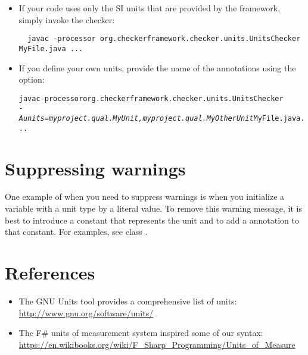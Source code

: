 \begin{itemize}
\item
If your code uses only the SI units that are provided by the
framework, simply invoke the checker:

\begin{Verbatim}
  javac -processor org.checkerframework.checker.units.UnitsChecker MyFile.java ...
\end{Verbatim}

\item
If you define your own units, provide the name of the annotations using the
 option:

\begin{alltt}
  javac -processor org.checkerframework.checker.units.UnitsChecker \ttbs
        \textit{-Aunits=myproject.qual.MyUnit,myproject.qual.MyOtherUnit} MyFile.java ...
\end{alltt}
\end{itemize}



\section{Suppressing warnings\label{units-suppressing}}

One example of when you need to suppress warnings is when you
initialize a variable with a unit type by a literal value.
To remove this warning message, it is best to introduce a
constant that represents the unit and to
add a 
annotation to that constant.
For examples, see class .


\section{References\label{units-references}}

\begin{itemize}
\item The GNU Units tool provides a comprehensive list of units:\\
  \url{http://www.gnu.org/software/units/}

\item The F\# units of measurement system inspired some of our syntax:\\
  \url{https://en.wikibooks.org/wiki/F_Sharp_Programming/Units_of_Measure}

\end{itemize}

